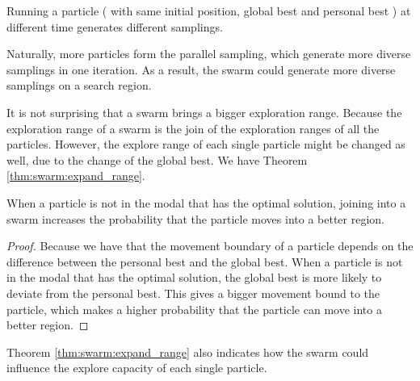 \begin{myprop}
\label{prop:swarm:more_samplings}
Running a particle ( with same initial position, global best and personal best ) at different time generates different samplings.
\end{myprop}
Naturally, more particles form the parallel sampling, which generate more diverse samplings in one iteration.
As a result, the swarm could generate more diverse samplings on a search region.

It is not surprising that a swarm brings a bigger exploration range.
Because the exploration range of a swarm is the join of the exploration ranges of all the particles.
However, the explore range of each single particle might be changed as well, due to the change of the global best.
We have Theorem \ref{thm:swarm:expand_range}.

\begin{mythm}
\label{thm:swarm:expand_range}
When a particle is not in the modal that has the optimal solution, joining into a swarm increases the probability that the particle moves into a better region.
\begin{proof}
Because we have that the movement boundary of a particle depends on the difference between the personal best and the global best.
When a particle is not in the modal that has the optimal solution, the global best is more likely to deviate from the personal best.
This gives a bigger movement bound to the particle, which makes a higher probability that the particle can move into a better region.
\end{proof}
\end{mythm}

Theorem \ref{thm:swarm:expand_range} also indicates how the swarm could influence the explore capacity of each single particle.

